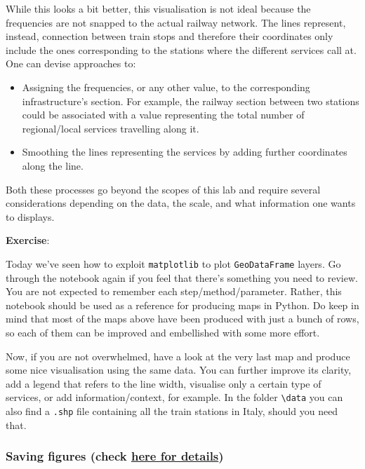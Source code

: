 \documentclass[
  letterpaper,
  DIV=11,
  numbers=noendperiod]{scrreprt}
\providecommand{\tightlist}{%
  \setlength{\itemsep}{0pt}\setlength{\parskip}{0pt}}\usepackage{longtable,booktabs,array}
\begin{document}
While this looks a bit better, this visualisation is not ideal because
the frequencies are not snapped to the actual railway network. The lines
represent, instead, connection between train stops and therefore their
coordinates only include the ones corresponding to the stations where
the different services call at. One can devise approaches to:

\begin{itemize}
\tightlist
\item
  Assigning the frequencies, or any other value, to the corresponding
  infrastructure's section. For example, the railway section between two
  stations could be associated with a value representing the total
  number of regional/local services travelling along it.
\item
  Smoothing the lines representing the services by adding further
  coordinates along the line.
\end{itemize}

Both these processes go beyond the scopes of this lab and require
several considerations depending on the data, the scale, and what
information one wants to displays.

\textbf{Exercise}:

Today we've seen how to exploit \texttt{matplotlib} to plot
\texttt{GeoDataFrame} layers. Go through the notebook again if you feel
that there's something you need to review. You are not expected to
remember each step/method/parameter. Rather, this notebook should be
used as a reference for producing maps in Python. Do keep in mind that
most of the maps above have been produced with just a bunch of rows, so
each of them can be improved and embellished with some more effort.

Now, if you are not overwhelmed, have a look at the very last map and
produce some nice visualisation using the same data. You can further
improve its clarity, add a legend that refers to the line width,
visualise only a certain type of services, or add information/context,
for example. In the folder \texttt{\textbackslash{}data} you can also
find a \texttt{.shp} file containing all the train stations in Italy,
should you need that.

\subsubsection{\texorpdfstring{Saving figures (check
\href{https://matplotlib.org/stable/api/_as_gen/matplotlib.pyplot.savefig.html}{here
for
details})}{Saving figures (check here for details)}}\label{saving-figures-check-here-for-details}
\end{document}
